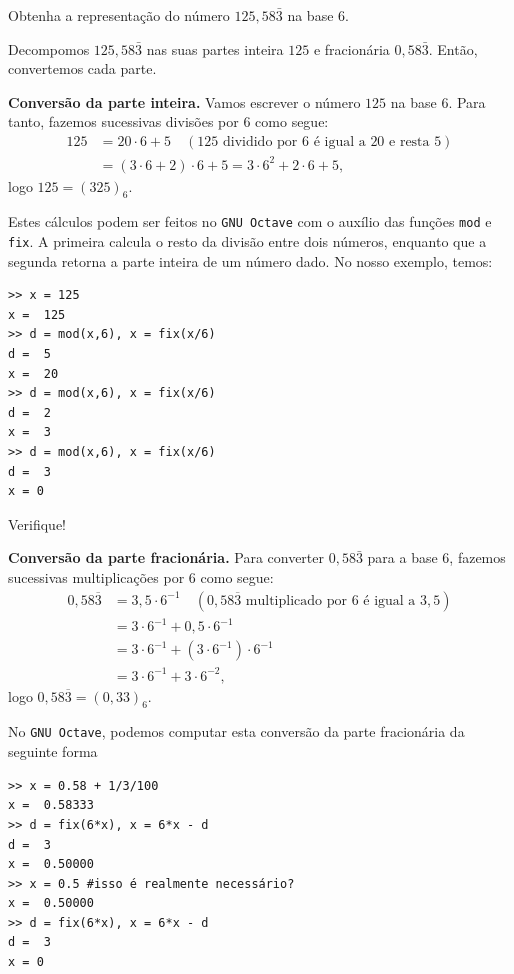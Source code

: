 \begin{exeresol}
Obtenha a representação do número $125,58\bar{3}$ na base $6$.
\end{exeresol}
\begin{resol}
  Decompomos $125,58\bar{3}$ nas suas partes inteira $125$ e fracionária $0,58\bar{3}$. Então, convertemos cada parte.

  {\bf Conversão da parte inteira.} Vamos escrever o número $125$ na base $6$. Para tanto, fazemos sucessivas divisões por $6$ como segue:
  \begin{equation}
    \begin{split}
      125 &= 20\cdot 6 + 5\quad(\mbox{$125$ dividido por $6$ é igual a $20$ e resta $5$})\\
      &= (3\cdot 6 + 2)\cdot 6 + 5 = 3\cdot 6^2 + 2\cdot 6 + 5,
    \end{split}
  \end{equation}
logo $125 = (325)_6$.

Estes cálculos podem ser feitos no \verb+GNU Octave+ com o auxílio das funções \verb'mod' e \verb'fix'. A primeira calcula o resto da divisão entre dois números, enquanto que a segunda retorna a parte inteira de um número dado. No nosso exemplo, temos:
\begin{verbatim}
>> x = 125
x =  125
>> d = mod(x,6), x = fix(x/6)
d =  5
x =  20
>> d = mod(x,6), x = fix(x/6)
d =  2
x =  3
>> d = mod(x,6), x = fix(x/6)
d =  3
x = 0
\end{verbatim}
Verifique!


{\bf Conversão da parte fracionária.} Para converter $0,58\bar{3}$ para a base $6$, fazemos sucessivas multiplicações por $6$ como segue:
  \begin{equation}
    \begin{split}
    0,58\overline{3} &= 3,5\cdot 6^{-1}\quad(\mbox{$0,58\overline{3}$ multiplicado por $6$ é igual a $3,5$})\\
    &= 3\cdot 6^{-1} + 0,5\cdot 6^{-1}\\
    &= 3\cdot 6^{-1} + (3\cdot 6^{-1})\cdot 6^{-1}\\
    &= 3\cdot 6^{-1} + 3\cdot 6^{-2},
    \end{split}
  \end{equation}
logo $0,58\overline{3} = (0,33)_6$.

No \verb+GNU Octave+, podemos computar esta conversão da parte fracionária da seguinte forma
\begin{verbatim}
>> x = 0.58 + 1/3/100
x =  0.58333
>> d = fix(6*x), x = 6*x - d
d =  3
x =  0.50000
>> x = 0.5 #isso é realmente necessário?
x =  0.50000
>> d = fix(6*x), x = 6*x - d
d =  3
x = 0
\end{verbatim}

\end{resol}

